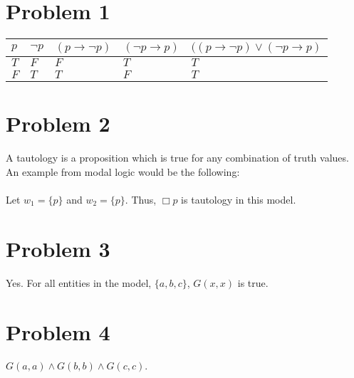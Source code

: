 \documentclass{article}%
\begin{document}
\section*{Problem 1}
\begin{tabular}{| l | l | l | l | l |}
    \hline
    $p$ & $\neg p$  & $(p \rightarrow \neg p)$  & $(\neg p \rightarrow p)$  & $((p \rightarrow \neg p) \vee (\neg p \rightarrow p)$ \\ \hline
    $T$ & $F$       & $F$                       & $T$                       & $T$ \\ \hline
    $F$ & $T$       & $T$                       & $F$                       & $T$ \\ \hline
\end{tabular}

\section*{Problem 2}

A tautology is a proposition which is true for any combination of truth values. An example from modal logic would
be the following:\\
\\
Let $w_1 = \{p\}$ and $w_2 = \{p\}$. Thus, $\Box p$ is tautology in this model.

\section*{Problem 3}

Yes. For all entities in the model, $\{a, b, c\}$, $G(x, x)$ is true.

\section*{Problem 4}

$G(a, a) \wedge G(b, b) \wedge G(c, c)$.
\end{document}
